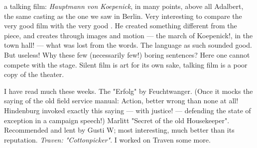  a talking film: \textit{Hauptmann von Koepenick}, in many points, above all Adalbert, the same casting as the one we saw in Berlin. Very interesting to compare the very good film with the very good . He created something different from the piece, and creates through images and motion — the march of Koepenick!, in the town hall! — what was lost from the words. The language as such sounded good. But useless! Why these few (necessarily few!) boring sentences? Here one cannot compete with the stage. Silent film is art for its own sake, talking film is a poor copy of the theater.

\missing

I have read much these weeks. The "Erfolg" by Feuchtwanger. (Once it mocks the saying of the old field service manual: Action, better wrong than none at all! Hindenburg invoked exactly this saying — with justice! — defending the state of exception in a campaign speech!)
Marlitt "Secret of the old Housekeeper". Recommended and lent by Gusti W; most interesting, much better than its reputation.
\textit{Traven: "Cottonpicker"}. I worked on Traven some more. \missing

